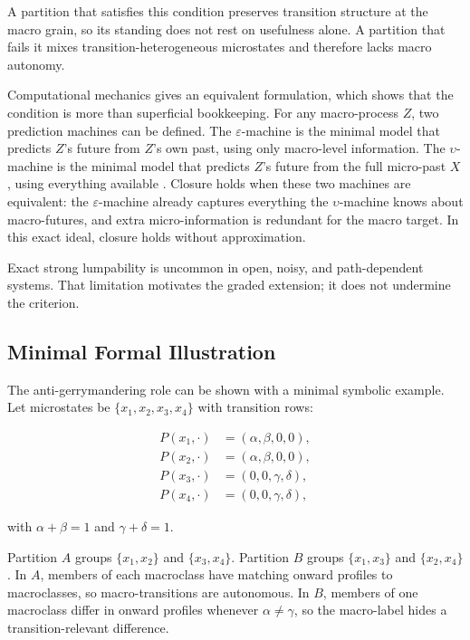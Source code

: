 A partition that satisfies this condition preserves transition
structure at the macro grain, so its standing does not rest on
usefulness alone. A partition that fails it mixes
transition-heterogeneous microstates and therefore lacks macro autonomy.

Computational mechanics gives an equivalent formulation, which shows
that the condition is more than superficial bookkeeping. For any
macro-process \(Z\), two prediction
machines can be defined. The \(\varepsilon\)-machine is the minimal
model that predicts \(Z\)'s future from \(Z\)'s own past, using only
macro-level information. The \(\upsilon\)-machine is the minimal model
that predicts \(Z\)'s future from the full micro-past \(X\), using
everything available \citep{shalizi2001,rosas2024}.
Closure holds when these two machines are equivalent: the
\(\varepsilon\)-machine already captures everything the
\(\upsilon\)-machine knows about macro-futures, and extra
micro-information is redundant for the macro target. In this exact
ideal, closure holds without approximation.

Exact strong lumpability is uncommon in open, noisy, and
path-dependent systems. That limitation motivates the graded extension;
it does not undermine the criterion.

\subsection{Minimal Formal
	Illustration}\label{minimal-formal-illustration}

The anti-gerrymandering role can be shown with a minimal symbolic
example. Let microstates be \(\{x_1,x_2,x_3,x_4\}\) with transition
rows:

\[
	\begin{aligned}
		P(x_1,\cdot) & = (\alpha,\beta,0,0),  \\
		P(x_2,\cdot) & = (\alpha,\beta,0,0),  \\
		P(x_3,\cdot) & = (0,0,\gamma,\delta), \\
		P(x_4,\cdot) & = (0,0,\gamma,\delta),
	\end{aligned}
\]

with \(\alpha+\beta=1\) and \(\gamma+\delta=1\).

Partition \(A\) groups \(\{x_1,x_2\}\) and \(\{x_3,x_4\}\). Partition
\(B\) groups \(\{x_1,x_3\}\) and \(\{x_2,x_4\}\). In \(A\), members of
each macroclass have matching onward profiles to macroclasses, so
macro-transitions are autonomous. In \(B\), members of one macroclass
differ in onward profiles whenever \(\alpha \neq \gamma\), so the
macro-label hides a transition-relevant difference.

